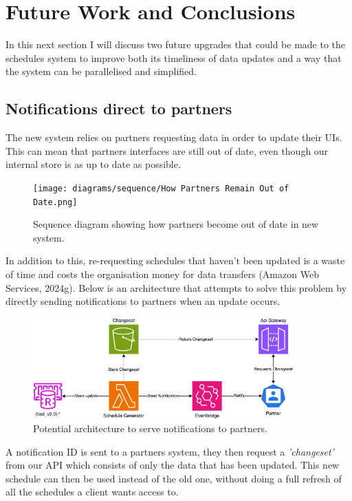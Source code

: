 \section{Future Work and Conclusions}
\label{sec:future}
In this next section I will discuss two future upgrades that could be made to the schedules system to improve both its timeliness of data updates
and a way that the system can be parallelised and simplified.

\subsection{Notifications direct to partners}
The new system relies on partners requesting data in order to update their UIs. This can mean that partners interfaces are still out of date, even 
though our internal store is as up to date as possible.

\begin{figure}[H]
  \centering
  \texttt{[image: diagrams/sequence/How Partners Remain Out of Date.png]}
  \caption{Sequence diagram showing how partners become out of date in new system.}
  \label{fig:sequenceOutOfDate}
\end{figure}

In addition to this, re-requesting schedules that haven't been updated is a waste of time and costs the organisation money for data 
transfers (Amazon Web Services, 2024g). Below is an architecture that attempts to solve this problem by directly sending notifications to 
partners when an update occurs.

\begin{figure}[H]
  \centering
  \includegraphics[width=10cm]{assets/architectures/changesets.drawio.png}
  \caption{Potential architecture to serve notifications to partners.}
  \label{fig:changsetArchitecture}
\end{figure}

A notification ID is sent to a partners system, they then request a \textit{'changeset'} from our API which consists of only the data that has been updated.
This new schedule can then be used instead of the old one, without doing a full refresh of all the schedules a client wants access to.

